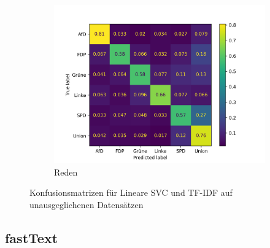 \begin{figure}[H]
    \hfill
    \begin{subfigure}{0.49\textwidth}
        \includegraphics[width=\textwidth]{data/images/modeling/baseline/none/speeches_confusion_matrix.png}
        \caption{Reden}
        \label{sfig:confusionMatrixBaselineSpeechesUnbalanced}
    \end{subfigure}
    \caption{Konfusionsmatrizen für Lineare \acs{SVC} und \acs{TF-IDF} auf unausgeglichenen Datensätzen} \label{fig:confusionMatrixBaselineUnbalanced}
\end{figure}

\subsection*{fastText}


